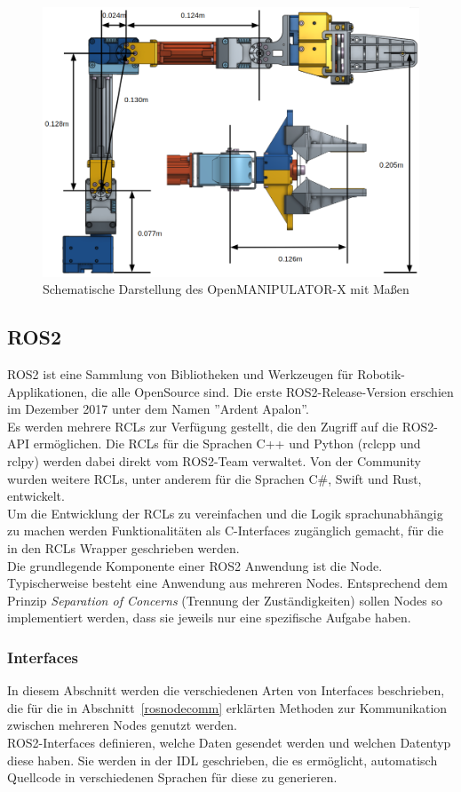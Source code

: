 \begin{figure}[ht!]
    \centering
    \includegraphics[width=.75\textwidth]{figs/omx_schematic}
    \caption[Schematische Darstellung des OpenMANIPULATOR-X mit Maßen]{Schematische Darstellung des OpenMANIPULATOR-X mit Maßen~\cite{omximg_schematic}}
    \label{fig:omxschematic}
\end{figure}
\subsection{ROS2}{\label{sec:ros2}}
\acf{ROS2} ist eine Sammlung von Bibliotheken und Werkzeugen für Robotik-Applikationen, die alle OpenSource sind.
Die erste \ac{ROS2}-Release-Version erschien im Dezember 2017 unter dem Namen ''Ardent Apalon''.\\
Es werden  mehrere \acp{RCL}  zur Verfügung gestellt, die den Zugriff auf die \ac{ROS2}-API ermöglichen.
Die \acp{RCL} für die Sprachen C++ und Python (rclcpp und rclpy) werden dabei direkt vom \ac{ROS2}-Team verwaltet.
Von der Community wurden weitere \acp{RCL}, unter anderem für die Sprachen C\#, Swift und Rust, entwickelt.\\
Um die Entwicklung der \acp{RCL} zu vereinfachen und die Logik sprachunabhängig zu machen werden Funktionalitäten als C-Interfaces zugänglich gemacht, für die in den \acp{RCL} Wrapper geschrieben werden.\\
Die grundlegende Komponente einer \ac{ROS2} Anwendung ist die Node.
Typischerweise besteht eine Anwendung aus mehreren Nodes.
Entsprechend dem Prinzip \emph{Separation of Concerns} (Trennung der Zuständigkeiten) sollen Nodes so implementiert werden, dass sie jeweils nur eine spezifische Aufgabe haben.
\subsubsection{Interfaces}
In diesem Abschnitt werden die verschiedenen Arten von Interfaces beschrieben, die für die in Abschnitt~\ref{rosnodecomm} erklärten Methoden zur Kommunikation zwischen mehreren Nodes genutzt werden.\\
\ac{ROS2}-Interfaces definieren, welche Daten gesendet werden und welchen Datentyp diese haben.
Sie werden in der \ac{IDL} geschrieben, die es ermöglicht, automatisch Quellcode in verschiedenen Sprachen für diese zu generieren.\\

